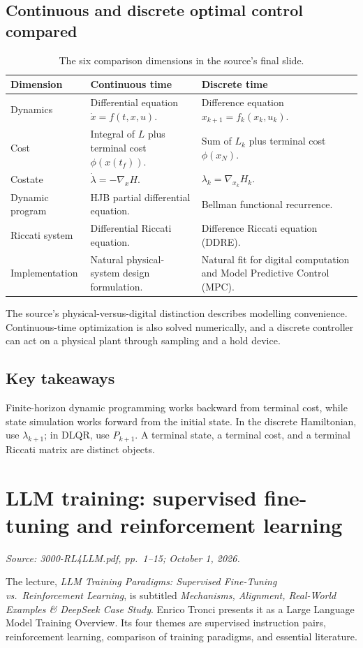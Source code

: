 \documentclass[11pt,a4paper]{article}
\numberwithin{equation}{section}
\numberwithin{figure}{section}
\numberwithin{table}{section}
\newcommand{\source}[1]{\par{\small\color{muted}\textit{Source: #1.}}\par}
\newcommand{\module}[2]{\clearpage\section{#1}\source{#2}}
\begin{document}
\subsection{Continuous and discrete optimal control compared}
\begin{table}[htbp]\centering\small
\caption{The six comparison dimensions in the source's final slide.}
\begin{tabularx}{\textwidth}{@{}P{26mm}YY@{}}\toprule
Dimension & Continuous time & Discrete time\\\midrule
Dynamics & Differential equation $\dot x=f(t,x,u)$. & Difference equation $x_{k+1}=f_k(x_k,u_k)$.\\\addlinespace
Cost & Integral of $L$ plus terminal cost $\phi(x(t_f))$. & Sum of $L_k$ plus terminal cost $\phi(x_N)$.\\\addlinespace
Costate & $\dot\lambda=-\nabla_xH$. & $\lambda_k=\nabla_{x_k}H_k$.\\\addlinespace
Dynamic program & HJB partial differential equation. & Bellman functional recurrence.\\\addlinespace
Riccati system & Differential Riccati equation. & Difference Riccati equation (DDRE).\\\addlinespace
Implementation & Natural physical-system design formulation. & Natural fit for digital computation and Model Predictive Control (MPC).\\\bottomrule
\end{tabularx}\end{table}\FloatBarrier
The source's physical-versus-digital distinction describes modelling convenience. Continuous-time optimization is also solved numerically, and a discrete controller can act on a physical plant through sampling and a hold device.

\subsection{Key takeaways}
Finite-horizon dynamic programming works backward from terminal cost, while state simulation works forward from the initial state. In the discrete Hamiltonian, use $\lambda_{k+1}$; in DLQR, use $P_{k+1}$. A terminal state, a terminal cost, and a terminal Riccati matrix are distinct objects.

\module{LLM training: supervised fine-tuning and reinforcement learning}{3000-RL4LLM.pdf, pp.\ 1--15; October 1, 2026}\label{sec:llm}
The lecture, \emph{LLM Training Paradigms: Supervised Fine-Tuning vs.\ Reinforcement Learning}, is subtitled \emph{Mechanisms, Alignment, Real-World Examples \& DeepSeek Case Study}. Enrico Tronci presents it as a Large Language Model Training Overview. Its four themes are supervised instruction pairs, reinforcement learning, comparison of training paradigms, and essential literature.
\end{document}
